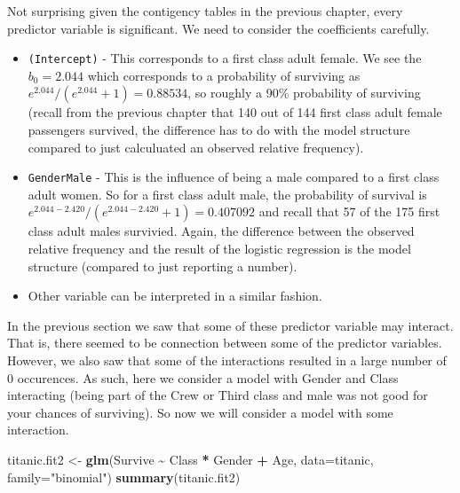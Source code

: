 \documentclass[
]{book}
\newenvironment{Shaded}{\begin{snugshade}}{\end{snugshade}}
\newcommand{\AttributeTok}[1]{\textcolor[rgb]{0.13,0.29,0.53}{#1}}
\newcommand{\FunctionTok}[1]{\textcolor[rgb]{0.13,0.29,0.53}{\textbf{#1}}}
\newcommand{\NormalTok}[1]{#1}
\newcommand{\OtherTok}[1]{\textcolor[rgb]{0.56,0.35,0.01}{#1}}
\newcommand{\SpecialCharTok}[1]{\textcolor[rgb]{0.81,0.36,0.00}{\textbf{#1}}}
\newcommand{\StringTok}[1]{\textcolor[rgb]{0.31,0.60,0.02}{#1}}
\providecommand{\tightlist}{%
  \setlength{\itemsep}{0pt}\setlength{\parskip}{0pt}}
\begin{document}
Not surprising given the contigency tables in the previous chapter, every predictor variable is significant. We need to consider the coefficients carefully.

\begin{itemize}
\tightlist
\item
  \texttt{(Intercept)} - This corresponds to a first class adult female. We see the \(b_0 = 2.044\) which corresponds to a probability of surviving as \(e^{2.044}/(e^{2.044}+1) = 0.88534\), so roughly a 90\% probability of surviving (recall from the previous chapter that 140 out of 144 first class adult female passengers survived, the difference has to do with the model structure compared to just calculuated an observed relative frequency).
\item
  \texttt{GenderMale} - This is the influence of being a male compared to a first class adult women. So for a first class adult male, the probability of survival is \(e^{2.044-2.420}/(e^{2.044-2.420}+1) = 0.407092\) and recall that 57 of the 175 first class adult males survivied. Again, the difference between the observed relative frequency and the result of the logistic regression is the model structure (compared to just reporting a number).
\item
  Other variable can be interpreted in a similar fashion.
\end{itemize}

In the previous section we saw that some of these predictor variable may interact. That is, there seemed to be connection between some of the predictor variables. However, we also saw that some of the interactions resulted in a large number of 0 occurences. As such, here we consider a model with Gender and Class interacting (being part of the Crew or Third class and male was not good for your chances of surviving). So now we will consider a model with some interaction.

\begin{Shaded}
\begin{Highlighting}[]
\NormalTok{titanic.fit2 }\OtherTok{\textless{}{-}} \FunctionTok{glm}\NormalTok{(Survive }\SpecialCharTok{\textasciitilde{}}\NormalTok{ Class }\SpecialCharTok{*}\NormalTok{ Gender }\SpecialCharTok{+}\NormalTok{ Age, }\AttributeTok{data=}\NormalTok{titanic, }\AttributeTok{family=}\StringTok{"binomial"}\NormalTok{)}
\FunctionTok{summary}\NormalTok{(titanic.fit2)}
\end{Highlighting}
\end{Shaded}
\end{document}
